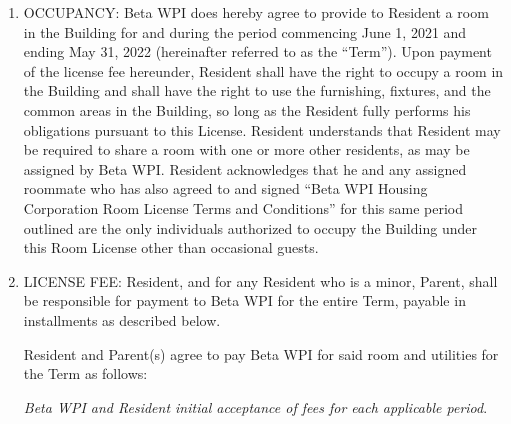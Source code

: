 \documentclass[12pt]{article}
\begin{document}
\begin{enumerate}


\item\label{itm:occupancy}

OCCUPANCY\@: Beta WPI does hereby agree to provide to Resident a room in the Building for and during the period commencing June 1, 2021 and ending May 31, 2022 (hereinafter referred to as the “Term”).
Upon payment of the license fee hereunder, Resident shall have the right to occupy a room in the Building and shall have the right to use the furnishing, fixtures, and the common areas in the Building, so long as the Resident fully performs his obligations pursuant to this License.
Resident understands that Resident may be required to share a room with one or more other residents, as may be assigned by Beta WPI\@.
Resident acknowledges that he and any assigned roommate who has also agreed to and signed “Beta WPI Housing Corporation Room License Terms and Conditions” for this same period outlined are the only individuals authorized to occupy the Building under this Room License other than occasional guests.

\item\label{itm:licensefee}

LICENSE FEE\@: Resident, and for any Resident who is a minor, Parent, shall be responsible for payment to Beta WPI for the entire Term, payable in installments as described below.

Resident and Parent(s) agree to pay Beta WPI for said room and utilities for the Term as follows:

\textit{Beta WPI and Resident initial acceptance of fees for each applicable period}.


\end{enumerate}
\end{document}
